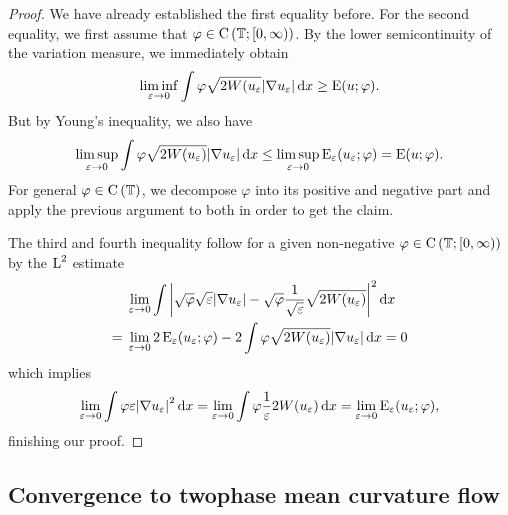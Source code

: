 \begin{proof}
	We have already established the first equality before. For the second equality, we first assume that $ \varphi \in \operatorname{C} \left( \operatorname{\mathbb{T}} ; [ 0 , \infty ) \right)$.
	By the lower semicontinuity of the variation measure, we immediately obtain
	\begin{equation*}
		\liminf_{ \varepsilon \to 0 }
		\int
		\varphi
		\sqrt{ 2 W ( u_{ \varepsilon } }
		\abs{ \nabla u_{ \varepsilon } }
		\dd{ x }
		\geq
		\operatorname{E} ( u ; \varphi ).
	\end{equation*}
	But by Young's inequality, we also have 
	\begin{equation*}
		\limsup_{ \varepsilon \to 0 }
		\int
		\varphi
		\sqrt{ 2 W ( u_{ \varepsilon } ) }
		\abs{ \nabla u_{ \varepsilon } }
		\dd{ x }
		\leq
		\limsup_{ \varepsilon \to 0 }
		\operatorname{E}_{ \varepsilon } ( u_{ \varepsilon } ; \varphi )
		= \operatorname{E} ( u ; \varphi ).
	\end{equation*}
	For general $ \varphi \in \operatorname{C} \left( \operatorname{\mathbb{T}} \right) $, we decompose $ \varphi $ into its positive and negative part and apply the previous argument to both in order to get the claim.
	
	The third and fourth inequality follow for a given non-negative $ \varphi \in \operatorname{C} \left( \operatorname{\mathbb{T}} ; [ 0 , \infty ) \right) $ by the $ \operatorname{L}^{ 2 } $ estimate
	\begin{align*}
		& \lim_{ \varepsilon \to 0 }
		\int
		\abs{ \sqrt{ \varphi } \sqrt{ \varepsilon } \abs{ \nabla u_{ \varepsilon } } - \sqrt{ \varphi } \frac{ 1 }{ \sqrt{ \varepsilon } } \sqrt{ 2 W ( u_{ \varepsilon } ) } }^{ 2 }
		\dd{ x }
		\\
		={} &
		\lim_{ \varepsilon \to 0 }
		2 \operatorname{E}_{ \varepsilon } ( u_{ \varepsilon } ; \varphi )
		-
		2 \int	
		\varphi
		\sqrt{ 2 W ( u_{ \varepsilon } ) }
		\abs{ \nabla u_{ \varepsilon } }
		\dd{ x }
		=
		0
	\end{align*}
	which implies
	\begin{equation*}
		\lim_{ \varepsilon \to 0 }
		\int
		\varphi
		\varepsilon
		\abs{ \nabla u_{ \varepsilon } }^{ 2 }
		\dd{ x }
		=
		\lim_{ \varepsilon \to 0}
		\int
		\varphi
		\frac{ 1 }{ \varepsilon }
		2 W ( u_{ \varepsilon } )
		\dd{ x }
		=
		\lim_{ \varepsilon \to 0 }
		\operatorname{E}_{ \varepsilon } ( u_{ \varepsilon } ; \varphi ),
	\end{equation*}
	finishing our proof.
\end{proof}

\subsection{Convergence to twophase mean curvature flow}

